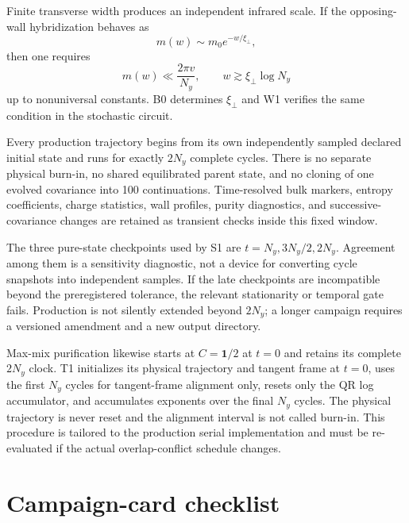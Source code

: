 \documentclass[aps,prx,twocolumn,floatfix,nofootinbib,superscriptaddress,longbibliography]{revtex4-2}
\begin{document}
Finite transverse width produces an independent infrared scale.  If the opposing-wall
hybridization behaves as
\begin{equation}
 m(w)\sim m_0e^{-w/\xi_\perp},
\end{equation}
then one requires
\begin{equation}
 m(w)\ll\frac{2\pi v}{N_y},
 \qquad
 w\gtrsim\xi_\perp\log N_y
\end{equation}
up to nonuniversal constants.  B0 determines $\xi_\perp$ and W1 verifies the same condition
in the stochastic circuit.

Every production trajectory begins from its own independently sampled declared initial
state and runs for exactly $2N_y$ complete cycles.  There is no separate physical burn-in,
no shared equilibrated parent state, and no cloning of one evolved covariance into 100
continuations.  Time-resolved bulk markers, entropy coefficients, charge statistics, wall
profiles, purity diagnostics, and successive-covariance changes are retained as transient
checks inside this fixed window.

The three pure-state checkpoints used by S1 are $t=N_y,3N_y/2,2N_y$.  Agreement among them
is a sensitivity diagnostic, not a device for converting cycle snapshots into independent
samples.  If the late checkpoints are incompatible beyond the preregistered tolerance, the
relevant stationarity or temporal gate fails.  Production is not silently extended beyond
$2N_y$; a longer campaign requires a versioned amendment and a new output directory.

Max-mix purification likewise starts at $C=\mathbf{1}/2$ at $t=0$ and retains its complete
$2N_y$ clock.  T1 initializes its physical trajectory and tangent frame at $t=0$, uses the
first $N_y$ cycles for tangent-frame alignment only, resets only the QR log accumulator,
and accumulates exponents over the final $N_y$ cycles.  The physical trajectory is never
reset and the alignment interval is not called burn-in.  This procedure is tailored to the
production serial implementation and must be re-evaluated if the actual overlap-conflict
schedule changes.

\section{Campaign-card checklist}
\end{document}
